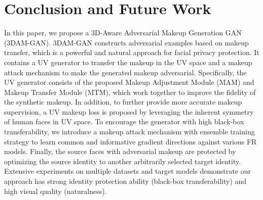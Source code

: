 \documentclass[10pt,journal,compsoc]{IEEEtran}
\begin{document}
\begin{table}[htb]
	\caption{The cosine similarities of different methods between the protected images (after printing and re-photographing) and the images with the same identity.}
	\centering
	\label{tab:tab_phy}
	\end{table}

\section{Conclusion and Future Work}
In this paper, we propose a 3D-Aware Adversarial Makeup Generation GAN (3DAM-GAN). 3DAM-GAN constructs adversarial examples based on makeup transfer, which is a powerful and natural approach for facial privacy protection.
It contains a UV generator to transfer the makeup in the UV space and a makeup attack mechanism to make the generated makeup adversarial. Specifically, the UV generator consists of the proposed Makeup Adjustment Module (MAM) and Makeup Transfer Module (MTM), which work together to improve the fidelity of the synthetic makeup. In addition, to further provide more accurate makeup supervision, a UV makeup loss is proposed by leveraging the inherent symmetry of human faces in UV space.
To encourage the generator with high black-box transferability, we introduce a makeup attack mechanism with ensemble training strategy to learn common and informative gradient directions against various FR models. Finally, the source faces with adversarial makeup are protected by optimizing the source identity to another arbitrarily selected target identity. Extensive experiments on multiple datasets and target models demonstrate our approach has strong identity protection ability (black-box transferability) and high visual quality (naturalness).
\end{document}
